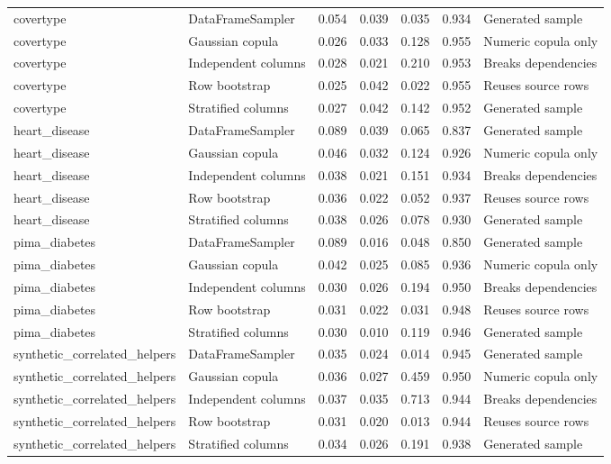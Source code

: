 \begin{table}
\begin{adjustbox}{max width=\columnwidth}
\begin{tabular}{llrrrrl}
covertype & DataFrameSampler & 0.054 & 0.039 & 0.035 & 0.934 & Generated sample \\
covertype & Gaussian copula & 0.026 & 0.033 & 0.128 & 0.955 & Numeric copula only \\
covertype & Independent columns & 0.028 & 0.021 & 0.210 & 0.953 & Breaks dependencies \\
covertype & Row bootstrap & 0.025 & 0.042 & 0.022 & 0.955 & Reuses source rows \\
covertype & Stratified columns & 0.027 & 0.042 & 0.142 & 0.952 & Generated sample \\
heart\_disease & DataFrameSampler & 0.089 & 0.039 & 0.065 & 0.837 & Generated sample \\
heart\_disease & Gaussian copula & 0.046 & 0.032 & 0.124 & 0.926 & Numeric copula only \\
heart\_disease & Independent columns & 0.038 & 0.021 & 0.151 & 0.934 & Breaks dependencies \\
heart\_disease & Row bootstrap & 0.036 & 0.022 & 0.052 & 0.937 & Reuses source rows \\
heart\_disease & Stratified columns & 0.038 & 0.026 & 0.078 & 0.930 & Generated sample \\
pima\_diabetes & DataFrameSampler & 0.089 & 0.016 & 0.048 & 0.850 & Generated sample \\
pima\_diabetes & Gaussian copula & 0.042 & 0.025 & 0.085 & 0.936 & Numeric copula only \\
pima\_diabetes & Independent columns & 0.030 & 0.026 & 0.194 & 0.950 & Breaks dependencies \\
pima\_diabetes & Row bootstrap & 0.031 & 0.022 & 0.031 & 0.948 & Reuses source rows \\
pima\_diabetes & Stratified columns & 0.030 & 0.010 & 0.119 & 0.946 & Generated sample \\
synthetic\_correlated\_helpers & DataFrameSampler & 0.035 & 0.024 & 0.014 & 0.945 & Generated sample \\
synthetic\_correlated\_helpers & Gaussian copula & 0.036 & 0.027 & 0.459 & 0.950 & Numeric copula only \\
synthetic\_correlated\_helpers & Independent columns & 0.037 & 0.035 & 0.713 & 0.944 & Breaks dependencies \\
synthetic\_correlated\_helpers & Row bootstrap & 0.031 & 0.020 & 0.013 & 0.944 & Reuses source rows \\
synthetic\_correlated\_helpers & Stratified columns & 0.034 & 0.026 & 0.191 & 0.938 & Generated sample \\

\end{tabular}
\end{adjustbox}
\end{table}
